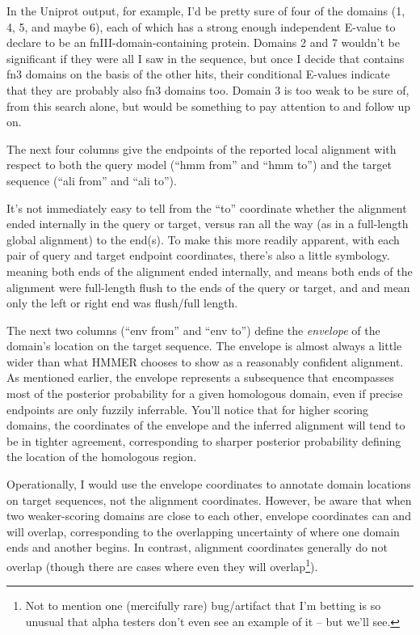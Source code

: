 In the Uniprot output, for example, I'd be pretty sure of four of the
domains (1, 4, 5, and maybe 6), each of which has a strong enough
independent E-value to declare  to be an
fnIII-domain-containing protein. Domains 2 and 7 wouldn't be
significant if they were all I saw in the sequence, but once I decide
that  contains fn3 domains on the basis of the
other hits, their conditional E-values indicate that they are probably
also fn3 domains too. Domain 3 is too weak to be sure of, from this
search alone, but would be something to pay attention to and follow up
on.

The next four columns give the endpoints of the reported local
alignment with respect to both the query model (``hmm from'' and ``hmm
to'') and the target sequence (``ali from'' and ``ali to''). 

It's not immediately easy to tell from the ``to'' coordinate whether
the alignment ended internally in the query or target, versus ran all
the way (as in a full-length global alignment) to the end(s). To make
this more readily apparent, with each pair of query and target
endpoint coordinates, there's also a little symbology. 
meaning both ends of the alignment ended internally, and \prog{[]}
means both ends of the alignment were full-length flush to the ends of
the query or target, and \prog{[.} and \prog{.]} mean only the left or
right end was flush/full length. 

The next two columns (``env from'' and ``env to'') define the
\emph{envelope} of the domain's location on the target sequence.  The
envelope is almost always a little wider than what HMMER chooses to
show as a reasonably confident alignment. As mentioned earlier, the
envelope represents a subsequence that encompasses most of the
posterior probability for a given homologous domain, even if precise
endpoints are only fuzzily inferrable. You'll notice that for higher
scoring domains, the coordinates of the envelope and the inferred
alignment will tend to be in tighter agreement, corresponding to
sharper posterior probability defining the location of the homologous
region. 

Operationally, I would use the envelope coordinates to annotate domain
locations on target sequences, not the alignment coordinates. However,
be aware that when two weaker-scoring domains are close to each other,
envelope coordinates can and will overlap, corresponding to the
overlapping uncertainty of where one domain ends and another begins.
In contrast, alignment coordinates generally do not overlap (though
there are cases where even they will overlap\footnote{Not to mention
  one (mercifully rare) bug/artifact that I'm betting is so unusual
  that alpha testers don't even see an example of it -- but we'll
  see.}).

